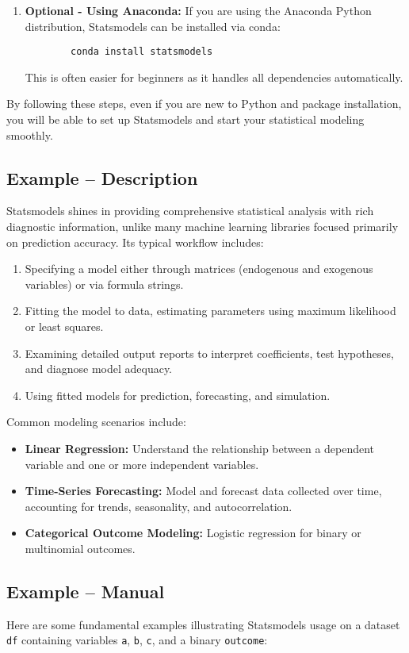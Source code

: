 \begin{enumerate}
	\item \textbf{Optional - Using Anaconda:}  
	If you are using the Anaconda Python distribution, Statsmodels can be installed via conda:
	\begin{verbatim}
		conda install statsmodels
	\end{verbatim}
	This is often easier for beginners as it handles all dependencies automatically.
\end{enumerate}

By following these steps, even if you are new to Python and package installation, you will be able to set up Statsmodels and start your statistical modeling smoothly.


\subsection{Example -- Description}
Statsmodels shines in providing comprehensive statistical analysis with rich diagnostic information, unlike many machine learning libraries focused primarily on prediction accuracy. Its typical workflow includes:

\begin{enumerate}
	\item Specifying a model either through matrices (endogenous and exogenous variables) or via formula strings.
	\item Fitting the model to data, estimating parameters using maximum likelihood or least squares.
	\item Examining detailed output reports to interpret coefficients, test hypotheses, and diagnose model adequacy.
	\item Using fitted models for prediction, forecasting, and simulation.
\end{enumerate}

Common modeling scenarios include:

\begin{itemize}
	\item \textbf{Linear Regression:} Understand the relationship between a dependent variable and one or more independent variables.
	\item \textbf{Time-Series Forecasting:} Model and forecast data collected over time, accounting for trends, seasonality, and autocorrelation.
	\item \textbf{Categorical Outcome Modeling:} Logistic regression for binary or multinomial outcomes.
\end{itemize}

\subsection{Example -- Manual}
Here are some fundamental examples illustrating Statsmodels usage on a dataset \texttt{df} containing variables \texttt{a}, \texttt{b}, \texttt{c}, and a binary \texttt{outcome}:

